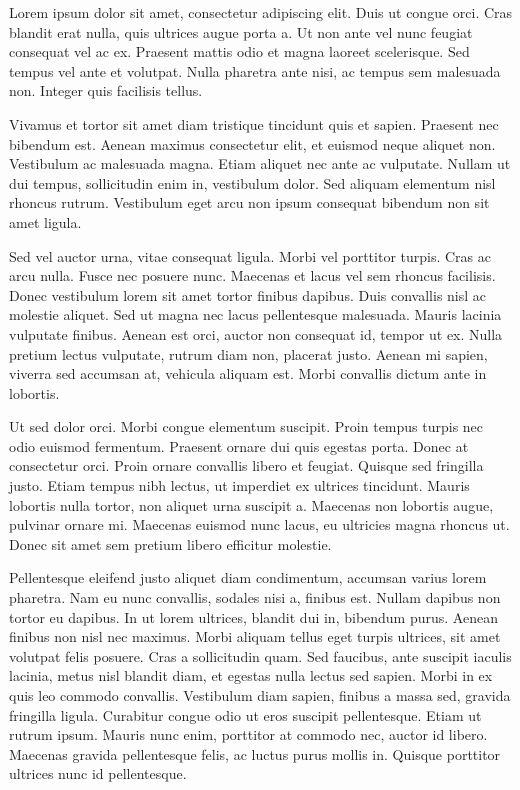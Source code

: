 

\label{chap:introduction}

Lorem ipsum dolor sit amet, consectetur adipiscing elit. Duis ut congue orci. Cras blandit erat nulla, quis ultrices augue porta a. Ut non ante vel nunc feugiat consequat vel ac ex. Praesent mattis odio et magna laoreet scelerisque. Sed tempus vel ante et volutpat. Nulla pharetra ante nisi, ac tempus sem malesuada non. Integer quis facilisis tellus.

Vivamus et tortor sit amet diam tristique tincidunt quis et sapien. Praesent nec bibendum est. Aenean maximus consectetur elit, et euismod neque aliquet non. Vestibulum ac malesuada magna. Etiam aliquet nec ante ac vulputate. Nullam ut dui tempus, sollicitudin enim in, vestibulum dolor. Sed aliquam elementum nisl rhoncus rutrum. Vestibulum eget arcu non ipsum consequat bibendum non sit amet ligula.

Sed vel auctor urna, vitae consequat ligula. Morbi vel porttitor turpis. Cras ac arcu nulla. Fusce nec posuere nunc. Maecenas et lacus vel sem rhoncus facilisis. Donec vestibulum lorem sit amet tortor finibus dapibus. Duis convallis nisl ac molestie aliquet. Sed ut magna nec lacus pellentesque malesuada. Mauris lacinia vulputate finibus. Aenean est orci, auctor non consequat id, tempor ut ex. Nulla pretium lectus vulputate, rutrum diam non, placerat justo. Aenean mi sapien, viverra sed accumsan at, vehicula aliquam est. Morbi convallis dictum ante in lobortis.

Ut sed dolor orci. Morbi congue elementum suscipit. Proin tempus turpis nec odio euismod fermentum. Praesent ornare dui quis egestas porta. Donec at consectetur orci. Proin ornare convallis libero et feugiat. Quisque sed fringilla justo. Etiam tempus nibh lectus, ut imperdiet ex ultrices tincidunt. Mauris lobortis nulla tortor, non aliquet urna suscipit a. Maecenas non lobortis augue, pulvinar ornare mi. Maecenas euismod nunc lacus, eu ultricies magna rhoncus ut. Donec sit amet sem pretium libero efficitur molestie.

Pellentesque eleifend justo aliquet diam condimentum, accumsan varius lorem pharetra. Nam eu nunc convallis, sodales nisi a, finibus est. Nullam dapibus non tortor eu dapibus. In ut lorem ultrices, blandit dui in, bibendum purus. Aenean finibus non nisl nec maximus. Morbi aliquam tellus eget turpis ultrices, sit amet volutpat felis posuere. Cras a sollicitudin quam. Sed faucibus, ante suscipit iaculis lacinia, metus nisl blandit diam, et egestas nulla lectus sed sapien. Morbi in ex quis leo commodo convallis. Vestibulum diam sapien, finibus a massa sed, gravida fringilla ligula. Curabitur congue odio ut eros suscipit pellentesque. Etiam ut rutrum ipsum. Mauris nunc enim, porttitor at commodo nec, auctor id libero. Maecenas gravida pellentesque felis, ac luctus purus mollis in. Quisque porttitor ultrices nunc id pellentesque.

